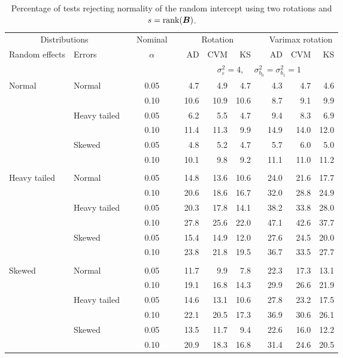 \begin{table}[ht]
\centering
\caption{\label{tab:fixedsimb0sB} Percentage of tests rejecting normality of the random intercept using two rotations and $s = \operatorname{rank}(\bm{B})$.}
\begin{scriptsize}
\begin{tabular}{ll p{.1cm} c p{.1cm} rrr p{.1cm} rrr}
  \hline
  \multicolumn{2}{c}{Distributions}& & Nominal & &  \multicolumn{3}{c}{Rotation} & & \multicolumn{3}{c}{Varimax rotation} \\ \cline{1-2} \cline{6-8} \cline{10-12}   
  Random effects & Errors & & $\alpha$ & & AD & CVM & KS & & AD & CVM & KS \\ 
   \hline
& && && \multicolumn{7}{c}{$\sigma_{\varepsilon}^2 = 4$, \ \ $\sigma_{b_0}^2 = \sigma_{b_1}^2 = 1$} \\ \cline{6-12}
\rowcolor{gray!20} Normal & Normal &  & 0.05 &  & 4.7 & 4.9 & 4.7 &  & 4.3 & 4.7 & 4.6 \\ 
\rowcolor{gray!20}   &  &  & 0.10 &  & 10.6 & 10.9 & 10.6 &  & 8.7 & 9.1 & 9.9 \\ 
\rowcolor{gray!20}   & Heavy tailed &  & 0.05 &  & 6.2 & 5.5 & 4.7 &  & 9.4 & 8.3 & 6.9 \\ 
\rowcolor{gray!20}   &  &  & 0.10 &  & 11.4 & 11.3 & 9.9 &  & 14.9 & 14.0 & 12.0 \\ 
\rowcolor{gray!20}   & Skewed &  & 0.05 &  & 4.8 & 5.2 & 4.7 &  & 5.7 & 6.0 & 5.0 \\ 
\rowcolor{gray!20}   &  &  & 0.10 &  & 10.1 & 9.8 & 9.2 &  & 11.1 & 11.0 & 11.2 \\ 
&&&&&&&&&&&\\
  Heavy tailed & Normal &  & 0.05 &  & 14.8 & 13.6 & 10.6 &  & 24.0 & 21.6 & 17.7 \\ 
  &  &  & 0.10 &  & 20.6 & 18.6 & 16.7 &  & 32.0 & 28.8 & 24.9 \\ 
  & Heavy tailed &  & 0.05 &  & 20.3 & 17.8 & 14.1 &  & 38.2 & 33.8 & 28.0 \\ 
  &  &  & 0.10 &  & 27.8 & 25.6 & 22.0 &  & 47.1 & 42.6 & 37.7 \\ 
  & Skewed &  & 0.05 &  & 15.4 & 14.9 & 12.0 &  & 27.6 & 24.5 & 20.0 \\ 
  &  &  & 0.10 &  & 23.8 & 21.8 & 19.5 &  & 36.7 & 33.5 & 27.7 \\ 
&&&&&&&&&&&\\
  Skewed & Normal &  & 0.05 &  & 11.7 & 9.9 & 7.8 &  & 22.3 & 17.3 & 13.1 \\ 
   &  &  & 0.10 &  & 19.1 & 16.8 & 14.3 &  & 29.9 & 26.6 & 21.9 \\ 
   & Heavy tailed &  & 0.05 &  & 14.6 & 13.1 & 10.6 &  & 27.8 & 23.2 & 17.5 \\ 
   &  &  & 0.10 &  & 22.1 & 20.5 & 17.3 &  & 36.9 & 30.6 & 26.1 \\ 
   & Skewed &  & 0.05 &  & 13.5 & 11.7 & 9.4 &  & 22.6 & 16.0 & 12.2 \\ 
   &  &  & 0.10 &  & 20.9 & 18.3 & 16.8 &  & 31.4 & 24.6 & 20.5 \\ 



\end{tabular}
\end{scriptsize}
\end{table}
